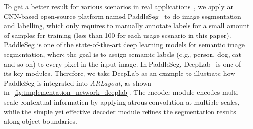 
To get a better result for various scenarios in real applications~\cite{Zhu2020},
we apply an CNN-based open-source platform named PaddleSeg~\cite{Liu2019,Liu2021a}
to do image segmentation and labelling,
which only requires to manually annotate labels for a small amount of
samples for training (less than 100 for each usage scenario in this paper).
PaddleSeg is one of the state-of-the-art deep learning models for semantic image segmentation,
where the goal is to assign semantic labels (e.g., person, dog, cat and so on)
to every pixel in the input image.
In PaddleSeg, DeepLab~\cite{Chen2018} is one of its key modules.
Therefore, we take DeepLab as an example to
illustrate how PaddleSeg is integrated into \textit{ARLayout},
as shown in~\autoref{fig:implementation_network_deeplab}.
The encoder module encodes multi-scale contextual information by
applying atrous convolution at multiple scales, while the simple yet effective decoder
module refines the segmentation results along object boundaries.

